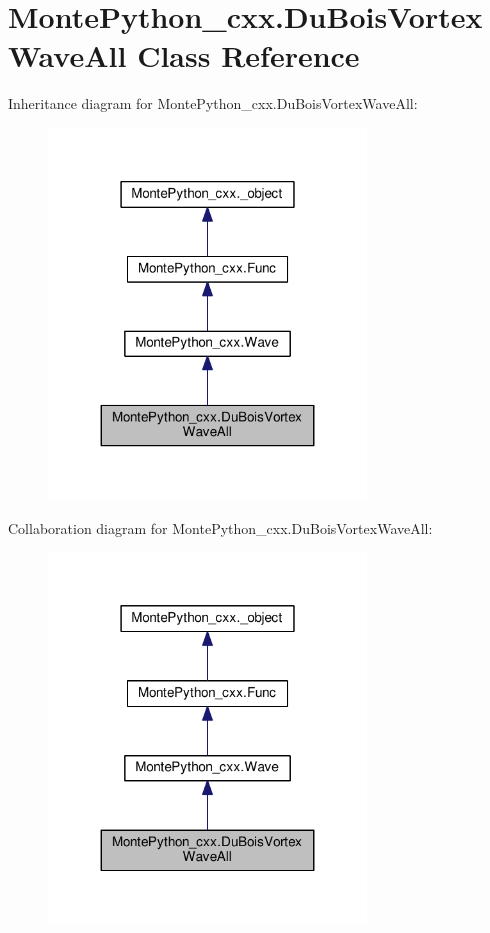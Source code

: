 \hypertarget{classMontePython__cxx_1_1DuBoisVortexWaveAll}{}\section{Monte\+Python\+\_\+cxx.\+Du\+Bois\+Vortex\+Wave\+All Class Reference}
\label{classMontePython__cxx_1_1DuBoisVortexWaveAll}


Inheritance diagram for Monte\+Python\+\_\+cxx.\+Du\+Bois\+Vortex\+Wave\+All\+:
\nopagebreak
\begin{figure}[H]
\begin{center}
\leavevmode
\includegraphics[width=239pt]{classMontePython__cxx_1_1DuBoisVortexWaveAll__inherit__graph}
\end{center}
\end{figure}


Collaboration diagram for Monte\+Python\+\_\+cxx.\+Du\+Bois\+Vortex\+Wave\+All\+:
\nopagebreak
\begin{figure}[H]
\begin{center}
\leavevmode
\includegraphics[width=239pt]{classMontePython__cxx_1_1DuBoisVortexWaveAll__coll__graph}
\end{center}
\end{figure}
